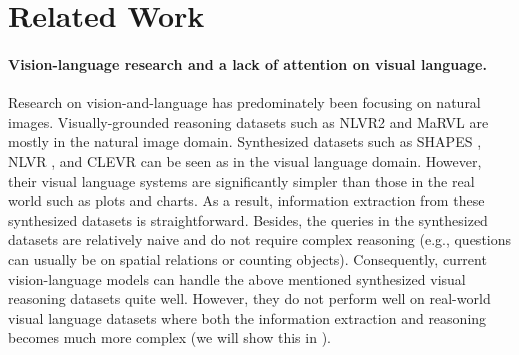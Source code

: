
\section{Related Work}\label{sec:rw}

\paragraph{Vision-language research and a lack of attention on visual language.}
Research on vision-and-language has predominately been focusing on natural images. Visually-grounded reasoning datasets such as NLVR2 \citep{suhr-etal-2019-corpus} and MaRVL \citep{liu-etal-2021-visually} are mostly in the natural image domain. Synthesized datasets such as SHAPES \citep{andreas2016neural}, NLVR \citep{suhr-etal-2017-corpus}, and CLEVR \citep{johnson2017clevr} can be seen as in the visual language domain. However, their visual language systems are significantly simpler than those in the real world such as plots and charts. As a result, information extraction from these synthesized datasets is straightforward. Besides, the queries in the synthesized datasets are relatively naive and do not require complex reasoning (e.g., questions can usually be on spatial relations or counting objects). Consequently, current vision-language models can handle the above mentioned synthesized visual reasoning datasets quite well. However, they do not perform well on real-world visual language datasets where both the information extraction and reasoning becomes much more complex (we will show this in ).


